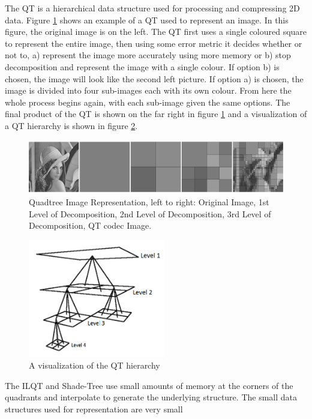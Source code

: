 The QT is a hierarchical data structure used for processing and compressing 2D data. Figure \ref{QuadtreeExample} shows an example of a QT used to represent an image. In this figure, the original image is on the left. The QT first uses a single coloured square to represent the entire image, then using some error metric it decides whether or not to, a) represent the image more accurately using more memory or b) stop decomposition and represent the image with a single colour. If option b) is chosen, the image will look like the second left picture. If option a) is chosen, the image is divided into four sub-images each with its own colour. From here the whole process begins again, with each sub-image given the same options. The final product of the QT is shown on the far right in figure \ref{QuadtreeExample} and a visualization of a QT hierarchy is shown in figure \ref{QuadTreeHierarchy}. \\


\begin{figure}[!htb]
\centering
\includegraphics[width=12cm]{images/ch2/quadtreeexample}
\caption{Quadtree Image Representation, left to right: Original Image, 1st Level of Decomposition, 2nd Level of Decomposition, 3rd Level of Decomposition, QT codec Image.}
\label{QuadtreeExample}
\end{figure}


\begin{figure}[!htb]
\centering
\includegraphics[width=6cm]{images/ch2/QuadTreeHierarchy}
\caption{A visualization of the QT hierarchy}
\label{QuadTreeHierarchy}
\end{figure}

The ILQT and Shade-Tree use small amounts of memory at the corners of the quadrants and interpolate to generate the underlying structure. The small data structures used for representation are very small 

